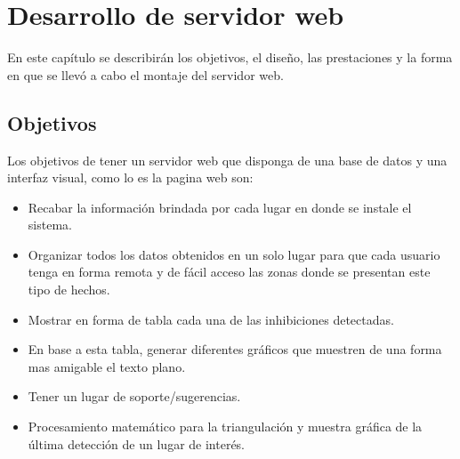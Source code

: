 \chapter{Desarrollo de servidor web}
\par En este capítulo se describirán los objetivos, el diseño, las prestaciones y la forma en que se llevó a cabo el montaje del servidor web.
\section{Objetivos}
\par Los objetivos de tener un servidor web que disponga de una base de datos y una interfaz visual, como lo es la pagina web son:

    \begin{itemize}
        \item Recabar la información brindada por cada lugar en donde se instale el sistema.
        \item Organizar todos los datos obtenidos en un solo lugar para que cada usuario tenga en forma remota y de fácil acceso las zonas donde se presentan este tipo de hechos. 
        \item Mostrar en forma de tabla cada una de las inhibiciones detectadas.
        \item En base a esta tabla, generar diferentes gráficos que muestren de una forma mas amigable el texto plano.
        \item Tener un lugar de soporte/sugerencias.
        \item Procesamiento matemático para la triangulación y muestra gráfica de la última detección de un lugar de interés. 
    \end{itemize}

